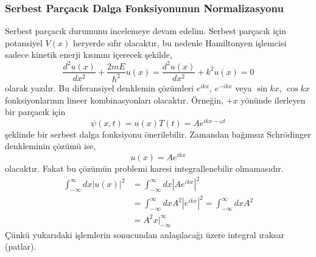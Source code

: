 \documentclass[a4paper,12pt, twoside]{article}
\begin{document}
\subsubsection{Serbest Parçacık Dalga Fonksiyonunun Normalizasyonu}

Serbest parçacık durumunu incelemeye devam edelim. Serbest parçacık için potansiyel $V(x)$ heryerde sıfır olacaktır, bu nedenle Hamiltonyen işlemcisi sadece kinetik enerji kısmını içerecek şekilde,
\begin{equation}
\frac { d ^ { 2 } u ( x ) } { d x ^ { 2 } } + \frac { 2 m E } { \hbar ^ { 2 } } u ( x ) = \frac { d ^ { 2 } u ( x ) } { d x ^ { 2 } } + k ^ { 2 } u ( x ) = 0
\end{equation}
olarak yazılır. Bu diferansiyel denklemin çözümleri $e ^ { i k x }$, $e ^ { - i k x }$ veya $\sin kx$, $\cos kx$ fonksiyonlarının lineer kombinasyonları olacaktır. Örneğin, $+x$ yönünde ilerleyen bir parçacık için
\begin{equation}
\psi(x,t) = u(x) T(t) = A e ^ { i k x -\omega t}
\end{equation}
şeklinde bir serbest dalga fonksiyonu önerilebilir. Zamandan bağımsız Schrödinger denkleminin çözümü ise,
\begin{equation}
u(x) = A e ^ { i k x }
\end{equation}
olacaktır. Fakat bu çözümün problemi karesi integrallenebilir olmamasıdır.
\begin{align}
\int _ { - \infty } ^ { \infty } d x \left|u(x) \right| ^ { 2 } 
&= \int _ { - \infty } ^ { \infty } d x \left|A e ^ { i k x } \right|^2 \nonumber\\
&= \int _ { - \infty } ^ { \infty } d x A^2 \left|e ^ { i k x } \right|^2
= \int _ { - \infty } ^ { \infty } d x A^2 \nonumber\\
&= A^2 x\bigg|_{-\infty}^\infty
\end{align}
Çünkü yukarıdaki işlemlerin sonucundan anlaşılacağı üzere integral ıraksar (patlar). 
\end{document}
